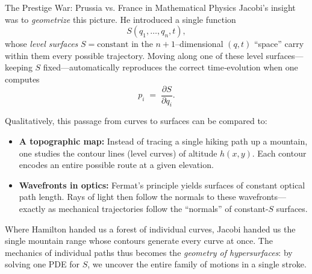 \begin{HistoricalSidebar}{The Prestige War: Prussia vs. France in Mathematical Physics}
Jacobi’s insight was to \emph{geometrize} this picture.  He introduced a single function 
\[
S(q_1,\dots,q_n,t),
\]
whose \emph{level surfaces} \(S=\mathrm{constant}\) in the \(n\!+\!1\)–dimensional \((q,t)\) “space” carry within them every possible trajectory.  Moving along one of these level surfaces—keeping \(S\) fixed—automatically reproduces the correct time‐evolution when one computes
\[
p_i \;=\;\frac{\partial S}{\partial q_i}.
\]

\medskip
Qualitatively, this passage from curves to surfaces can be compared to:

\begin{itemize}
  \item \textbf{A topographic map:}  Instead of tracing a single hiking path up a mountain, one studies the contour lines (level curves) of altitude \(h(x,y)\).  Each contour encodes an entire possible route at a given elevation.
  \item \textbf{Wavefronts in optics:}  Fermat’s principle yields surfaces of constant optical path length.  Rays of light then follow the normals to these wavefronts—exactly as mechanical trajectories follow the “normals” of constant-\(S\) surfaces.
\end{itemize}

Where Hamilton handed us a forest of individual curves, Jacobi handed us the single mountain range whose contours generate every curve at once.  The mechanics of individual paths thus becomes the \emph{geometry of hypersurfaces}: by solving one PDE for \(S\), we uncover the entire family of motions in a single stroke.



\end{HistoricalSidebar}
